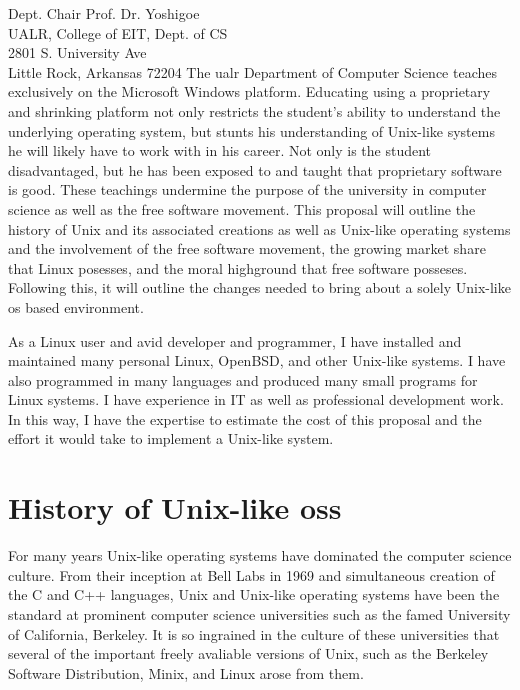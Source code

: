 \documentclass{letter}
\begin{document}
\begin{letter}{
    Dept. Chair Prof. Dr. Yoshigoe \\
    UALR, College of EIT, Dept. of CS \\
    2801 S. University Ave \\
    Little Rock, Arkansas 72204
  }
    The \gls{ualr} Department of Computer Science teaches exclusively on the Microsoft Windows platform. Educating using a proprietary and shrinking platform not only restricts the student's ability to understand the underlying operating system, but stunts his understanding of Unix-like systems he will likely have to work with in his career. Not only is the student disadvantaged, but he has been exposed to and taught that proprietary software is good. These teachings undermine the purpose of the university in computer science as well as the free software movement. This proposal will outline the history of Unix and its associated creations as well as Unix-like operating systems and the involvement of the free software movement, the growing market share that Linux posesses, and the moral highground that free software posseses. Following this, it will outline the changes needed to bring about a solely Unix-like \gls{os} based environment.

    As a Linux user and avid developer and programmer, I have installed and maintained many personal Linux, OpenBSD, and other Unix-like systems. I have also programmed in many languages and produced many small programs for Linux systems. I have experience in IT as well as professional development work. In this way, I have the expertise to estimate the cost of this proposal and the effort it would take to implement a Unix-like system.

    \section{History of Unix-like \glspl{os}}

    For many years Unix-like operating systems have dominated the computer science culture. From their inception at Bell Labs in 1969 and simultaneous creation of the C and C++ languages, Unix and Unix-like operating systems have been the standard at prominent computer science universities such as the famed University of California, Berkeley. It is so ingrained in the culture of these universities that several of the important freely avaliable versions of Unix, such as the Berkeley Software Distribution, Minix, and Linux arose from them.


\end{letter}
\end{document}
